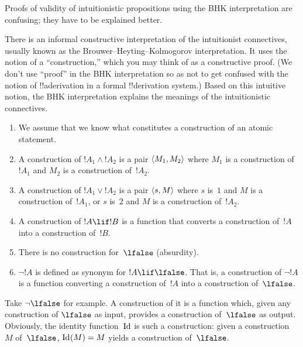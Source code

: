 \documentclass[../../../include/open-logic-section]{subfiles}
\begin{document}


\begin{editorial}
  Proofs of validity of intuitionistic propositions using the BHK
  interpretation are confusing; they have to be explained better.
\end{editorial}

There is an informal constructive interpretation of the intuitionist
connectives, usually known as the Brouwer--Heyting--Kolmogorov
interpretation. It uses the notion of a ``construction,'' which you
may think of as a constructive proof. (We don't use ``proof'' in the
BHK interpretation so as not to get confused with the notion of
!!a{derivation} in a formal !!{derivation} system.) Based on this intuitive
notion, the BHK interpretation explains the meanings of the
intuitionistic connectives.

\begin{enumerate}
\item We assume that we know what constitutes a construction of an atomic
  statement.
\item A construction of $!A_1 \land !A_2$ is a pair $\langle M_1, M_2 \rangle$
  where $M_1$ is a construction of~$!A_1$ and $M_2$ is a construction
  of~$!A_2$.
\item A construction of $!A_1 \lor !A_2$ is a pair $\langle s, M \rangle$
  where $s$ is~$1$ and $M$ is a construction of~$!A_1$, or $s$ is~$2$
  and $M$ is a construction of~$!A_2$.
\item A construction of $!A \lif !B$ is a function that converts a
  construction of~$!A$ into a construction of~$!B$.
\item There is no construction for~$\lfalse$ (absurdity).
\item $\lnot !A$ is defined as synonym for $!A \lif \lfalse$. That is,
  a construction of $\lnot !A$ is a function converting a construction
  of~$!A$ into a construction of~$\lfalse$.
\end{enumerate}

\begin{ex}
Take $\lnot \lfalse$ for example. A construction of it is a function
which, given any construction of $\lfalse$ as input, provides a
construction of~$\lfalse$ as output. Obviously, the identity
function~$\mathord{\mathrm{Id}_{}}$ is such a construction: given a construction~$M$
of~$\lfalse$, $\mathord{\mathrm{Id}_{}}(M) = M$ yields a construction of~$\lfalse$.
\end{ex}
\end{document}
